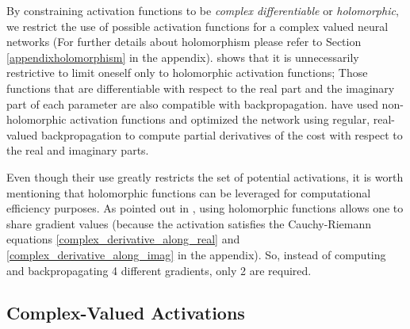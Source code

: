 \documentclass{article}
\begin{document}
By constraining activation functions to be \textit{complex differentiable} or \textit{holomorphic}, we restrict the use of possible activation functions for a complex valued neural networks (For further details about holomorphism please refer to Section \ref{appendixholomorphism} in the appendix). \cite{hirose2012generalization} shows that it is unnecessarily restrictive to limit oneself only to holomorphic activation functions; Those functions that are differentiable with respect to the real part and the imaginary part of each parameter are also compatible with backpropagation. \citep{arjovsky2015unitary,wisdom2016full,danihelka2016associative} have used non-holomorphic activation functions and optimized the network using regular, real-valued backpropagation to compute partial derivatives of the cost with respect to the real and imaginary parts.

Even though their use greatly restricts the set of potential activations, it is worth mentioning that holomorphic functions can be leveraged for computational efficiency purposes. As pointed out in \cite{sarroff2015learning}, using holomorphic functions allows one to share gradient values (because the activation satisfies the Cauchy-Riemann equations \ref{complex_derivative_along_real} and \ref{complex_derivative_along_imag} in the appendix). So, instead of computing and backpropagating 4 different gradients, only 2 are required.

\subsection{Complex-Valued Activations}\label{activation_func}
\end{document}
